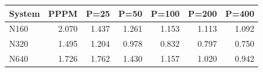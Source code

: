 \begin{tabular}{lrrrrrr}
\toprule
System & PPPM & P=25 & P=50 & P=100 & P=200 & P=400 \\
\midrule
N160 & 2.070 & 1.437 & 1.261 & 1.153 & 1.113 & 1.092 \\
N320 & 1.495 & 1.204 & 0.978 & 0.832 & 0.797 & 0.750 \\
N640 & 1.726 & 1.762 & 1.430 & 1.157 & 1.020 & 0.942 \\
\bottomrule
\end{tabular}
